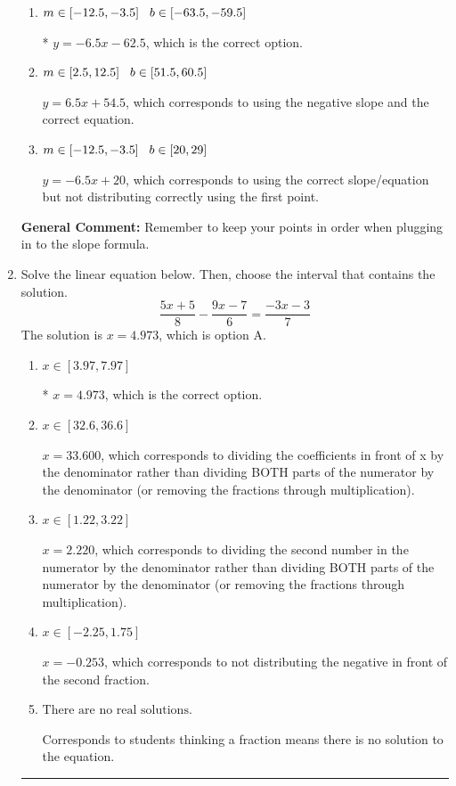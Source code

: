 \documentclass{extbook}[14pt]
\newcommand{\litem}[1]{\item #1

\rule{\textwidth}{0.4pt}}
\begin{document}
\begin{enumerate}
{\begin{enumerate}[label=\Alph*.]
 $y = -6.5x + 62.5$, which corresponds to using the correct slope and getting the negative y-intercept.
\item \( m \in [-12.5, -3.5] \hspace*{3mm} b \in [-63.5, -59.5] \)

* $y = -6.5x -62.5$, which is the correct option.
\item \( m \in [2.5, 12.5] \hspace*{3mm} b \in [51.5, 60.5] \)

 $y = 6.5x + 54.5$, which corresponds to using the negative slope and the correct equation.
\item \( m \in [-12.5, -3.5] \hspace*{3mm} b \in [20, 29] \)

 $y = -6.5x + 20$, which corresponds to using the correct slope/equation but not distributing correctly using the first point.
\end{enumerate}

\textbf{General Comment:} Remember to keep your points in order when plugging in to the slope formula.
}
\litem{
Solve the linear equation below. Then, choose the interval that contains the solution.
\[ \frac{5x + 5}{8} - \frac{9x -7}{6} = \frac{-3x -3}{7} \]The solution is \( x = 4.973 \), which is option A.\begin{enumerate}[label=\Alph*.]
\item \( x \in [3.97, 7.97] \)

* $x = 4.973$, which is the correct option.
\item \( x \in [32.6, 36.6] \)

 $x = 33.600$, which corresponds to dividing the coefficients in front of x by the denominator rather than dividing BOTH parts of the numerator by the denominator (or removing the fractions through multiplication).
\item \( x \in [1.22, 3.22] \)

 $x = 2.220$, which corresponds to dividing the second number in the numerator by the denominator rather than dividing BOTH parts of the numerator by the denominator (or removing the fractions through multiplication).
\item \( x \in [-2.25, 1.75] \)

 $x = -0.253$, which corresponds to not distributing the negative in front of the second fraction.
\item \( \text{There are no real solutions.} \)

Corresponds to students thinking a fraction means there is no solution to the equation.
\end{enumerate}

}
\end{enumerate}
\end{document}

